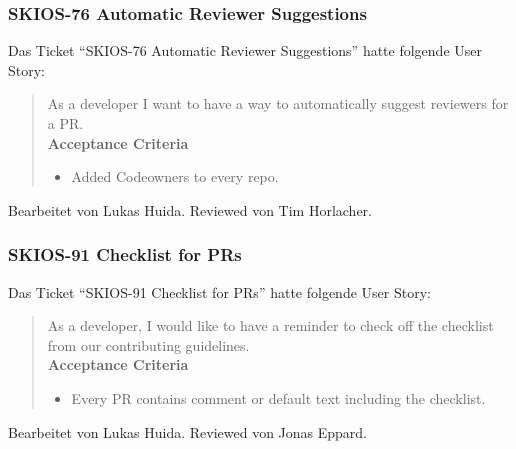 \subsubsection{SKIOS-76 Automatic Reviewer Suggestions}
Das Ticket \enquote{SKIOS-76 Automatic Reviewer Suggestions} hatte folgende User Story:
\begin{quotation}
    As a developer I want to have a way to automatically suggest reviewers for a PR. \\
    \textbf{Acceptance Criteria}
    \begin{itemize}
        \item Added Codeowners to every repo.
    \end{itemize}
\end{quotation}
Bearbeitet von Lukas Huida.
Reviewed von Tim Horlacher.

\subsubsection{SKIOS-91 Checklist for PRs}
Das Ticket \enquote{SKIOS-91 Checklist for PRs} hatte folgende User Story:
\begin{quotation}
    As a developer, I would like to have a reminder to check off the checklist from our contributing guidelines. \\
    \textbf{Acceptance Criteria}
    \begin{itemize}
        \item Every PR contains comment or default text including the checklist.
    \end{itemize}
\end{quotation}
Bearbeitet von Lukas Huida.
Reviewed von Jonas Eppard.

